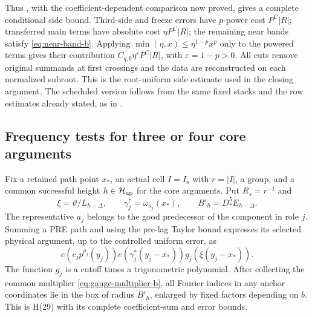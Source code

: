 Thus \cite[Proposition~7.5]{H}, with the coefficient-dependent
comparison now proved, gives a complete conditional side bound.
Third-side and freeze errors have \(p\)-power cost \(P^C|R|\);
transferred main terms have absolute cost \(\eta P^C|R|\);
the remaining near bands satisfy \eqref{eq:near-band-b}.
Applying \(\min(\eta,x)\le\eta^{1-p}x^p\) only to the powered
terms gives their contribution \(C_{q,b}\eta^\varepsilon P^C|R|\),
with \(\varepsilon=1-p>0\).  All cuts remove original summands at
first crossings and the data are reconstructed on each normalized
subroot.  This is the root-uniform side estimate used in the closing
argument.  The scheduled version follows from the same fixed stacks
and the row estimates already stated, as in \cite[Section~6.5]{V}.

\subsection{Frequency tests for three or four core arguments}

Fix a retained path point \(x_*\), an actual cell \(I=I_s\) with
\(r=|I|\), a group, and a common successful height
\(h\in\mathcal H_{\rm up}\) for the
core arguments.  Put \(R_s=r^{-1}\) and
\[
 \xi=\vartheta/L_{h-\Delta},\qquad
 \gamma_j^*=\omega_{a_j}(x_*),\qquad B'_h=D_*^5E_{h-\Delta}.
\]
The representative \(a_j\) belongs to the good predecessor of the
component in role \(j\).  Summing a PRE path and using the pre-lag
Taylor bound expresses its selected physical argument, up to the
controlled uniform error, as
\[
 e(c_jp^{\rho_j}(y_j))e(\gamma_j^*(y_j-x_*))
                 g_j(\xi(y_j-x_*)).
\]
The function \(g_j\) is a cutoff times a trigonometric polynomial.
After collecting the common multiplier
\eqref{eq:gauge-multiplier-b}, all Fourier indices in any anchor
coordinates lie in the box of radius \(B'_h\), enlarged by fixed
factors depending on \(b\).  This is H(29) with its complete
coefficient-sum and error bounds.

